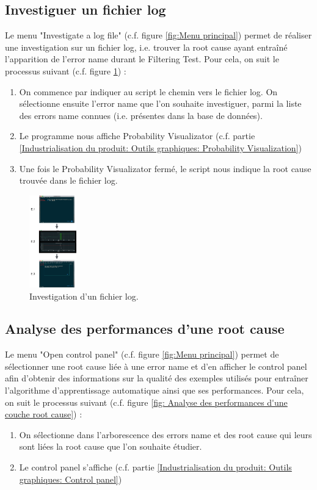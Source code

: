 \subsection{Investiguer un fichier log}
\label{Industrialisation du produit: Utilisation suggérée des outils: Investiguer}
Le menu "Investigate a log file" (c.f. figure \ref{fig:Menu principal}) permet de réaliser une investigation sur un fichier log, i.e. trouver la root cause ayant entraîné l'apparition de l'error name durant le Filtering Test. Pour cela, on suit le processus suivant (c.f. figure \ref{fig: Investigation d'un fichier log}) : 
\begin{enumerate}
	\item On commence par indiquer au script le chemin vers le fichier log. On sélectionne ensuite l'error name que l'on souhaite investiguer, parmi la liste des errors name connues (i.e. présentes dans la base de données).
	\item Le programme nous affiche Probability Visualizator (c.f. partie \ref{Industrialisation du produit: Outils graphiques: Probability Visualization})
	\item Une fois le Probability Visualizator fermé, le script nous indique la root cause trouvée dans le fichier log. 
\end{enumerate}

\begin{figure}[H]
	\centering\includegraphics[height=4cm]{images/invest_menu.png}
	\caption[Investigation d'un fichier log]{Investigation d'un fichier log.}
	\label{fig: Investigation d'un fichier log}
\end{figure} 

\subsection{Analyse des performances d'une  root cause}
\label{Industrialisation du produit: Utilisation suggérée des outils: Analyse des performances d'une  root cause}
Le menu "Open control panel" (c.f. figure \ref{fig:Menu principal}) permet de sélectionner une root cause liée à une error name et d'en afficher le control panel afin d'obtenir des informations sur la qualité des exemples utilisés pour entraîner l'algorithme d'apprentissage automatique ainsi que ses performances. Pour cela, on suit le processus suivant (c.f. figure \ref{fig: Analyse des performances d'une couche root cause}) : 
\begin{enumerate}
	\item On sélectionne dans l'arborescence des errors name et des root cause qui leurs sont liées la root cause que l'on souhaite étudier.
	\item Le control panel s'affiche (c.f. partie \ref{Industrialisation du produit: Outils graphiques: Control panel})
\end{enumerate}

